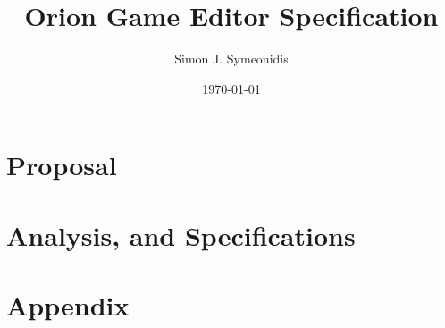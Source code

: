 \documentclass[twoside,12pt]{book}
\title{Orion Game Editor Specification}
\author{Simon J. Symeonidis}
\date{\today}
\begin{document}

\pagestyle{fancy}
\maketitle
\newpage
\rhead[]{\textbf{\color{psyan}\nouppercase{\rightmark}}}
\lhead[\textbf{\color{psyan}\nouppercase{\leftmark}}]{}

\newpage
\setcounter{tocdepth}{3}
\tableofcontents
\listoffigures
\newpage


\rfoot[]{\thepage}
\cfoot{}
\lfoot[\thepage]{}

\chapter{Proposal}



\chapter{Analysis, and Specifications}




\chapter{Appendix}


{}

\end{document}
